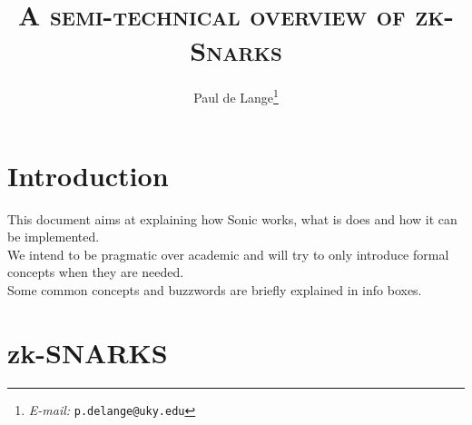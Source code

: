 \documentclass[11pt,oneside]{article}
\theoremstyle{definition}
\theoremstyle{remark}
\numberwithin{equation}{section}
\begin{document}


\title{
\vspace{-35pt}
    \textsc{\huge{{A} semi-technical overview of zk-{S}narks\\}
        }
    }

\renewcommand{\thefootnote}{\fnsymbol{footnote}} 
   
\renewcommand{\thefootnote}{\arabic{footnote}} 

\author{
	Paul de Lange\footnote{
	\newline\indent\indent
	{\em E-mail:} {\tt p.delange@uky.edu}
	}
}


\maketitle
{}



\clearpage

\tableofcontents

\clearpage

\section{Introduction}\label{sec:intro}
This document aims at explaining how Sonic works, what is does and how it can be implemented.\\
We intend to be pragmatic over academic and will try to only introduce formal concepts when they are needed.\\
Some common concepts and buzzwords are briefly explained in info boxes.

\clearpage



\section{zk-SNARKS}\label{sec:zksnarks}
\end{document}

